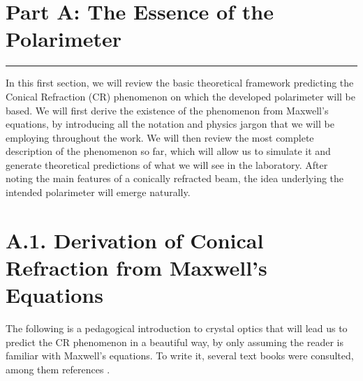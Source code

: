 \documentclass[11pt, a4paper, twoside]{article} %
\begin{document}
\newpage

\newpage


\newpage
\null
\clearpage
\newpage

\section*{\centering \huge{Part A: The Essence of the Polarimeter}\vspace{-0.4cm}}
\noindent\rule{\textwidth}{0.4pt}
\vspace{-0.4cm}

In this first section, we will review the basic theoretical framework predicting the Conical Refraction (CR) phenomenon on which the developed polarimeter will be based. We will first derive the existence of the phenomenon from Maxwell's equations, by introducing all the notation and physics jargon that we will be employing throughout the work. We will then review the most complete description of the phenomenon so far, which will allow us to simulate it and generate theoretical predictions of what we will see in the laboratory. After noting the main features of a conically refracted beam, the idea underlying the intended polarimeter will emerge naturally.\vspace{-0.2cm}

\section*{A.1. Derivation of Conical Refraction from Maxwell's Equations\vspace{-0.2cm}}
The following is a pedagogical introduction to crystal optics that will lead us to predict the CR phenomenon in a beautiful way, by only assuming the reader is familiar with Maxwell's equations. To write it, several text books were consulted, among them references \cite{LL,magnetostatic,fundamentals}.\vspace{-0.3cm}
\end{document}

